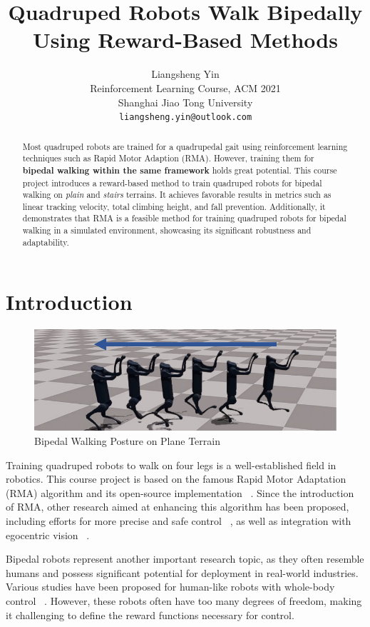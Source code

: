 \documentclass{article} %
\title{Quadruped Robots Walk Bipedally \\ Using Reward-Based Methods}
\author{Liangsheng Yin \\
Reinforcement Learning Course, ACM 2021\\
Shanghai Jiao Tong University\\
\texttt{liangsheng.yin@outlook.com} \\ }
\begin{document}
\maketitle

\begin{abstract}
   Most quadruped robots are trained for a quadrupedal gait using reinforcement learning techniques such as Rapid Motor Adaption (RMA). However, training them for \textbf{bipedal walking within the same framework} holds great potential. This course project introduces a reward-based method to train quadruped robots for bipedal walking on \textit{plain} and \textit{stairs} terrains. It achieves favorable results in metrics such as linear tracking velocity, total climbing height, and fall prevention. Additionally, it demonstrates that RMA is a feasible method for training quadruped robots for bipedal walking in a simulated environment, showcasing its significant robustness and adaptability. 
\end{abstract}

\section{Introduction}

\begin{figure}[H]
   \centering
   \includegraphics[width=1.0\textwidth]{plane_walk.pdf}
   \caption{Bipedal Walking Posture on Plane Terrain}
   \label{fig:plan_walk}
\end{figure}

Training quadruped robots to walk on four legs is a well-established field in robotics. This course project is based on the famous Rapid Motor Adaptation (RMA) algorithm and its open-source implementation ~\citep{kumar2021rma}. Since the introduction of RMA, other research aimed at enhancing this algorithm has been proposed, including efforts for more precise and safe control ~\citep{SAVIOLO202345}, as well as integration with egocentric vision ~\cite{pmlr-v205-agarwal23a}.

Bipedal robots represent another important research topic, as they often resemble humans and possess significant potential for deployment in real-world industries. Various studies have been proposed for human-like robots with whole-body control ~\citep{cheng2024expressive}. However, these robots often have too many degrees of freedom, making it challenging to define the reward functions necessary for control.
\end{document}
